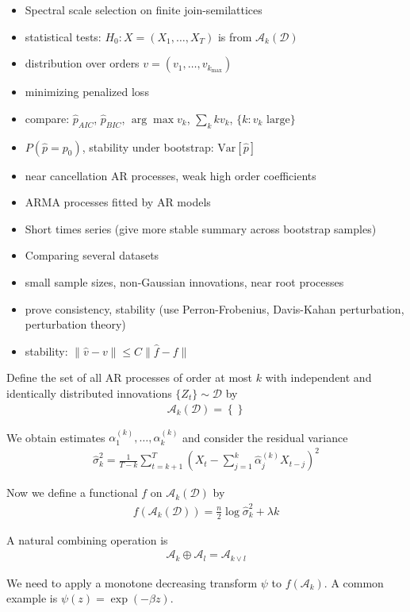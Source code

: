 \begin{itemize}
    \item Spectral scale selection on finite join-semilattices
    \item statistical tests: $H_0:X=(X_1,\dots,X_T)$ is from $\mathcal{A}_k(\mathcal{D})$
    \item distribution over orders $v=(v_{1},\dots,v_{k_{\max}})$
    \item minimizing penalized loss
    \item compare: $\hat{p}_{AIC}$, $\hat{p}_{BIC}$, $\arg\max v_k$, $\sum_kkv_k$, $\{k:v_k\text{ large}\}$
    \item $P(\hat{p}=p_0)$, stability under bootstrap: $\text{Var}[\hat{p}]$
    \item near cancellation AR processes, weak high order coefficients
    \item ARMA processes fitted by AR models
    \item Short times series (give more stable summary across bootstrap samples)
    \item Comparing several datasets
    \item small sample sizes, non-Gaussian innovations, near root processes
    \item prove consistency, stability (use Perron-Frobenius, Davis-Kahan perturbation, perturbation theory)
    \item stability: $\|\hat{v}-v\|\le C\|\hat{f}-f\|$
\end{itemize}

Define the set of all AR processes of order at most $k$ with independent and identically distributed innovations $\{Z_t\}\sim\mathcal{D}$ by
\begin{align*}
    \mathcal{A}_k(\mathcal{D})=\left\{\right\}
\end{align*}

We obtain estimates $\alpha_1^{(k)},\dots,\alpha_k^{(k)}$ and consider the residual variance
\begin{align*}
    \hat{\sigma}_k^2=\frac{1}{T-k}\sum_{t=k+1}^{T}\left(X_t-\sum_{j=1}^{k}\hat{\alpha}_j^{(k)}X_{t-j}\right)^2
\end{align*}

Now we define a functional $f$ on $\mathcal{A}_k(\mathcal{D})$ by
\begin{align*}
    f(\mathcal{A}_k(\mathcal{D}))=\frac{n}{2}\log{\hat{\sigma}^2_k}+\lambda k
\end{align*}

A natural combining operation is
\begin{align*}
    \mathcal{A}_k\oplus\mathcal{A}_l=\mathcal{A}_{k\vee l}
\end{align*}

We need to apply a monotone decreasing transform $\psi$ to $f(\mathcal{A}_k)$. A common example is $\psi(z)=\exp{(-\beta z)}$.


